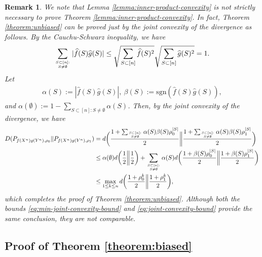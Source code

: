 \documentclass[journal,draftcls, onecolumn]{IEEEtran}
\newtheorem{remark}{Remark}
\newcommand{\rom}[1]{\mathrm{#1}}
\begin{document}
\begin{remark}
We note that Lemma \ref{lemma:inner-product-convexity} is not strictly necessary to
prove Theorem \ref{lemma:inner-product-convexity}. In fact, Theorem \ref{theorem:unbiased}
can be proved just by the joint convexity of the divergence as follows.
By the Cauchu-Schwarz inequality, we have
\begin{align}
\sum_{S \subset [n]: \atop S \neq \emptyset} |\widehat{f}(S) \widehat{g}(S)| 
\le \sqrt{\sum_{S\subset [n]} \widehat{f}(S)^2} \sqrt{\sum_{S\subset [n]} \widehat{g}(S)^2} =1.
\end{align}
Let 
\begin{align}
\alpha(S) := |\widehat{f}(S) \widehat{g}(S)|,~\beta(S) := \rom{sgn}(\widehat{f}(S) \widehat{g}(S)),
\end{align}
and $\alpha(\emptyset) := 1 - \sum_{S\subset [n]: S\neq \emptyset} \alpha(S)$.
Then, by the joint convexity of the divergence, we have
\begin{align}
D(P_{f(X^n)g(Y^n),\rho_0} \| P_{f(X^n)g(Y^n),\rho_1}) 
&= d\bigg( \frac{1+ \sum_{S\subset [n]:\atop S \neq \emptyset}  \alpha(S) \beta(S) \rho_0^{|S|}}{2} \bigg\| 
  \frac{1 + \sum_{S \subset [n]: \atop S \neq \emptyset}  \alpha(S)\beta(S) \rho_1^{|S|}}{2} \bigg) \\
 &\le \alpha(\emptyset)  d\bigg(\frac{1}{2} \bigg\| \frac{1}{2} \bigg)
  + \sum_{S\subset [n]:\atop S \neq \emptyset}  \alpha(S) d\bigg( \frac{1+\beta(S) \rho_0^{|S|}}{2} \bigg\| \frac{1+\beta(S) \rho_1^{|S|}}{2} \bigg)
  \label{eq:joint-convexity-bound} \\
  &\le \max_{1\le k \le n} d\bigg( \frac{1+\rho_0^k}{2} \bigg\| \frac{1+\rho_1^k}{2} \bigg),
\end{align}
which completes the proof of Theorem \ref{theorem:unbiased}.
Although both the bounds \eqref{eq:min-joint-convexity-bound} and \eqref{eq:joint-convexity-bound}
provide the same conclusion, they are not comparable.
\end{remark}

\subsection{Proof of Theorem \ref{theorem:biased}}
\end{document}
